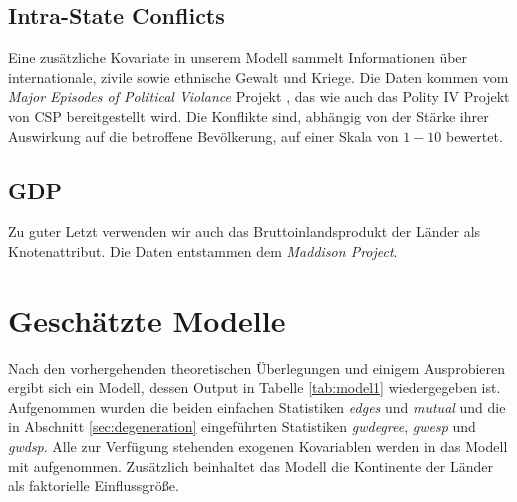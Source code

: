 \documentclass[a4paper,ngerman,oneside,titlepage,bibliography=totoc,11pt]{scrreprt}
\begin{document}
\subsection{Intra-State Conflicts}
Eine zusätzliche Kovariate in unserem Modell sammelt Informationen über internationale, zivile sowie ethnische Gewalt und Kriege. Die Daten kommen vom \emph{Major Episodes of Political Violance} Projekt \citep{conflict}, das wie auch das Polity IV Projekt von CSP bereitgestellt wird. Die Konflikte sind, abhängig von der Stärke ihrer Auswirkung auf die betroffene Bevölkerung, auf einer Skala von $1-10$ bewertet.

\subsection{GDP}
Zu guter Letzt verwenden wir auch das Bruttoinlandsprodukt der Länder als Knotenattribut. Die Daten entstammen dem \emph{Maddison Project}\citep{GDP}. 

\section{Geschätzte Modelle}

Nach den vorhergehenden theoretischen Überlegungen und einigem Ausprobieren ergibt sich ein Modell, dessen Output in Tabelle \ref{tab:model1} wiedergegeben ist. Aufgenommen wurden die beiden einfachen Statistiken \emph{edges} und \emph{mutual} und die in Abschnitt \ref{sec:degeneration} eingeführten Statistiken \emph{gwdegree}, \emph{gwesp} und \emph{gwdsp}. Alle zur Verfügung stehenden exogenen Kovariablen werden in das Modell mit aufgenommen. Zusätzlich beinhaltet das Modell die Kontinente der Länder als faktorielle Einflussgröße.
\end{document}
